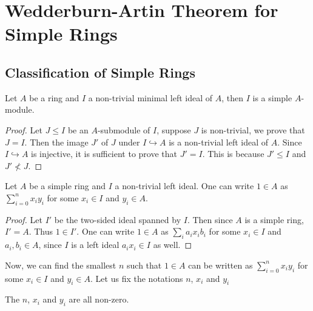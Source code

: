 

\section{Wedderburn-Artin Theorem for Simple Rings}\label{sec:wed-artin}

\subsection{Classification of Simple Rings}\label{sec:wed-artin-proof}


\begin{lemma}\label{lemma:min-ideal-simple-ring}
  Let $A$ be a ring and $I$ a non-trivial minimal left ideal of $A$, then $I$ is
  a simple $A$-module.
  \leanok
\end{lemma}
\begin{proof}
  Let $J\le I$ be an $A$-submodule of $I$, suppose $J$ is non-trivial, we prove
  that $J=I$. Then the image $J'$ of $J$ under $I \hookrightarrow A$ is a
  non-trivial left ideal of $A$. Since $I \hookrightarrow A$ is injective, it is
  sufficient to prove that $J' = I$. This is because $J'\le I$ and $J' \not< J$.
\end{proof}

\begin{lemma}
  Let $A$ be a simple ring and $I$ a non-trivial left ideal. One can write
  $1 \in A$ as $\sum_{i=0}^{n}x_{i}y_{i}$ for some $x_{i}\in I$ and
  $y_{i} \in A$.
\end{lemma}

\begin{proof}
  Let $I'$ be the two-sided ideal spanned by $I$. Then since $A$ is a simple
  ring, $I' = A$. Thus $1 \in I'$. One can write $1 \in A$ as
  $\sum_{i}a_{i}x_{i}b_{i}$ for some $x_{i}\in I$ and $a_{i},b_{i}\in A$, since
  $I$ is a left ideal $a_{i}x_{i}\in I$ as well.
\end{proof}

Now, we can find the smallest $n$ such that $1\in A$ can be written as
$\sum_{i=0}^{n}x_{i}y_{i}$ for some $x_{i}\in I$ and $y_{i}\in A$. Let us fix
the notations $n$, $x_{i}$ and $y_{i}$

\begin{lemma} The $n$, $x_{i}$ and $y_{i}$ are all non-zero. \leanok
\end{lemma}

